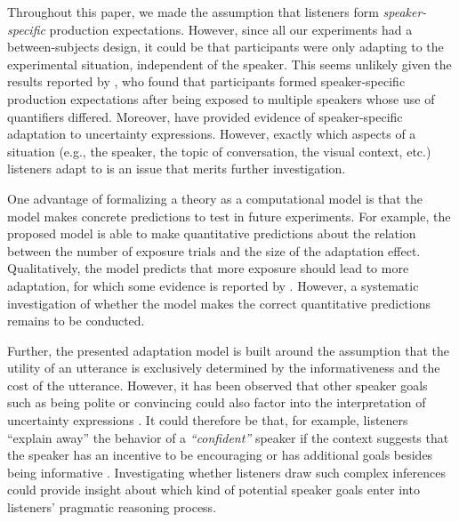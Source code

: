 \documentclass[man, floatsintext]{apa6}
\newcommand{\jd}[1]{\textcolor{PinkyPurple}{\textbf{[jd: #1]}}}
\begin{document}
Throughout this paper, we made the assumption that listeners  form \textit{speaker-specific} production expectations. However,
since all our experiments had a between-subjects design, it could be that participants were only adapting to the experimental
situation, independent of the speaker. This seems unlikely given the results reported by \textcite{Yildirim2016}, who found that
participants formed speaker-specific production expectations after being exposed to multiple speakers whose use of
quantifiers differed. Moreover,  \parencite{Schuster2019} have provided evidence of speaker-specific adaptation to 
uncertainty expressions. However, exactly which aspects of a situation (e.g., the speaker, the topic of conversation, the visual context, etc.)
listeners adapt to is an issue that merits further investigation.


One advantage of formalizing a theory as a computational model is that the model 
makes concrete predictions to test in future experiments. For example, the proposed
model is able to make quantitative predictions about the relation between the number of exposure
trials and the size of the adaptation effect. Qualitatively, the model predicts that more exposure
should lead to more adaptation, for which some evidence is reported by \textcite{Schuster2019}.
However,  a systematic investigation of whether the model makes the correct quantitative predictions remains to be conducted. 


Further, the presented adaptation model is built around the assumption that the utility of an utterance is exclusively determined
by the informativeness and the cost of the utterance. However, it has been observed that other speaker goals such as being polite or
convincing could also factor into the interpretation of uncertainty expressions \parencite[see e.g,][]{Pighin2011,Juanchich2013,Holtgraves2016}.
It could therefore be that, for example, listeners ``explain away'' the behavior of a \textit{``confident''} speaker if the context suggests that the speaker
has an incentive to be encouraging or has additional goals besides being informative \parencite[see also][]{Yoon2016,Yoon2017}. Investigating whether listeners draw such complex inferences
could provide  insight about which kind of potential speaker goals enter into listeners' pragmatic reasoning process.
\end{document}

